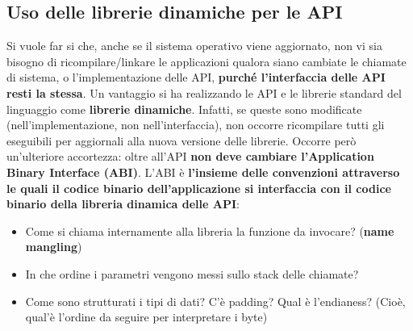 \documentclass[12pt]{article}
\begin{document}
\subsection{Uso delle librerie dinamiche per le API}
Si vuole far si che, anche se il sistema operativo viene aggiornato, non vi sia bisogno di ricompilare/linkare le applicazioni qualora siano cambiate le chiamate di sistema, o l'implementazione delle API,
\textbf{purché l'interfaccia delle API resti la stessa}.
Un vantaggio si ha realizzando le API e le librerie standard del linguaggio come \textbf{librerie dinamiche}. Infatti, se queste sono modificate (nell'implementazione, non nell'interfaccia), non occorre
ricompilare tutti gli eseguibili per aggiornali alla nuova versione delle librerie.
Occorre però un'ulteriore accortezza: oltre all'API \textbf{non deve cambiare l'Application Binary Interface (ABI)}.
L'ABI è \textbf{l'insieme delle convenzioni attraverso le quali il codice binario dell'applicazione si interfaccia con il codice binario della libreria dinamica delle API}:
\begin{itemize}
    \item Come si chiama internamente alla libreria la funzione da invocare? (\textbf{name mangling})
    \item In che ordine i parametri vengono messi sullo stack delle chiamate?
    \item Come sono strutturati i tipi di dati? C'è padding? Qual è l'endianess? (Cioè, qual'è l'ordine da seguire per interpretare i byte) 
\end{itemize}
\end{document}
